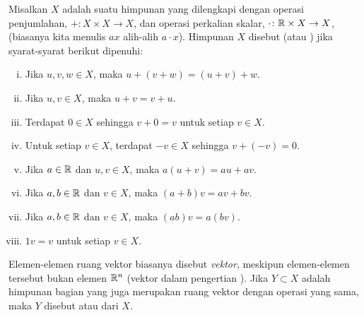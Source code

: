 \begin{defn}
Misalkan $X$ adalah suatu himpunan yang dilengkapi dengan
operasi penjumlahan, $+ \colon X \times X \to X$,
dan operasi perkalian skalar, $\cdot \colon {\mathbb{R}} \times X \to X$,
(biasanya kita menulis $ax$ alih-alih $a \cdot x$).
Himpunan $X$ disebut \emph{}
(atau \emph{})
jika syarat-syarat berikut dipenuhi:
\begin{enumerate}[(i)]
\item
Jika $u, v, w \in X$, maka $u+(v+w) = (u+v)+w$.
\item
Jika $u, v \in X$, maka $u+v = v+u$.
\item \label{vecspacedefn:addidentity}
Terdapat $0 \in X$ sehingga $v+0=v$ untuk setiap $v \in X$.
\item \label{vecspacedefn:addinverse}
Untuk setiap $v \in X$, terdapat $-v \in X$
sehingga $v+(-v)=0$.
\item
Jika $a \in {\mathbb{R}}$ dan $u,v \in X$, maka
$a(u+v) = au+av$.
\item
Jika $a,b \in {\mathbb{R}}$ dan $v \in X$, maka
$(a+b)v = av+bv$.
\item
Jika $a,b \in {\mathbb{R}}$ dan $v \in X$, maka
$(ab)v = a(bv)$.
\item
$1v = v$ untuk setiap $v \in X$.
\end{enumerate}
Elemen-elemen ruang vektor biasanya disebut \emph{vektor},
meskipun elemen-elemen tersebut
bukan elemen ${\mathbb{R}}^n$ (vektor dalam pengertian ).
%
Jika $Y \subset X$ adalah himpunan bagian yang juga merupakan ruang vektor dengan
operasi yang sama, maka $Y$ disebut \emph{} atau
\emph{} dari $X$.
\end{defn}

